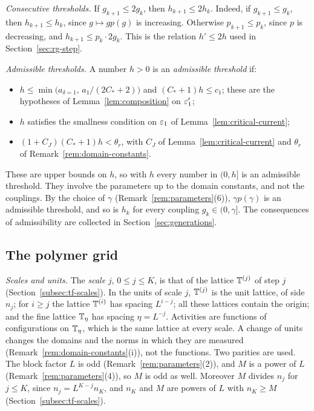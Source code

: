 \emph{Consecutive thresholds.} If $g_{k+1}\le2g_k$, then $h_{k+1}\le2h_k$. Indeed, if $g_{k+1}\le g_k$, then $h_{k+1}\le h_k$, since $g\mapsto gp(g)$ is increasing. Otherwise $p_{k+1}\le p_k$, since $p$ is decreasing, and $h_{k+1}\le p_k\cdot2g_k$. This is the relation $h'\le2h$ used in Section~\ref{sec:rg-step}.

\emph{Admissible thresholds.} A number $h>0$ is an \emph{admissible threshold} if:
\begin{itemize}
\item $h\le\min\big(a_{\delta=1},\,a_1/(2C_*+2)\big)$ and $(C_*+1)h\le c_1$; these are the hypotheses of Lemma~\ref{lem:composition} on $\varepsilon'_1$;
\item $h$ satisfies the smallness condition on $\varepsilon_1$ of Lemma~\ref{lem:critical-current};
\item $(1+C_J)(C_*+1)h<\theta_r$, with $C_J$ of Lemma~\ref{lem:critical-current} and $\theta_r$ of Remark~\ref{rem:domain-constants}.
\end{itemize}
These are upper bounds on $h$, so with $h$ every number in $(0,h]$ is an admissible threshold. They involve the parameters up to the domain constants, and not the couplings. By the choice of $\gamma$ (Remark~\ref{rem:parameters}(6)), $\gamma p(\gamma)$ is an admissible threshold, and so is $h_k$ for every coupling $g_k\in(0,\gamma]$. The consequences of admissibility are collected in Section~\ref{sec:generations}.

\subsection{The polymer grid}\label{subsec:flow-norm}

\emph{Scales and units.} The \emph{scale} $j$, $0\le j\le K$, is that of the lattice $\mathbb T^{(j)}$ of step $j$ (Section~\ref{subsec:tf-scales}). In the units of scale $j$, $\mathbb T^{(j)}$ is the unit lattice, of side $n_j$; for $i\ge j$ the lattice $\mathbb T^{(i)}$ has spacing $L^{i-j}$; all these lattices contain the origin; and the fine lattice $\mathbb T_\eta$ has spacing $\eta=L^{-j}$. Activities are functions of configurations on $\mathbb T_\eta$, which is the same lattice at every scale. A change of units changes the domains and the norms in which they are measured (Remark~\ref{rem:domain-constants}(i)), not the functions. Two parities are used. The block factor $L$ is odd (Remark~\ref{rem:parameters}(2)), and $M$ is a power of $L$ (Remark~\ref{rem:parameters}(4)), so $M$ is odd as well. Moreover $M$ divides $n_j$ for $j\le K$, since $n_j=L^{K-j}n_K$, and $n_K$ and $M$ are powers of $L$ with $n_K\ge M$ (Section~\ref{subsec:tf-scales}).

